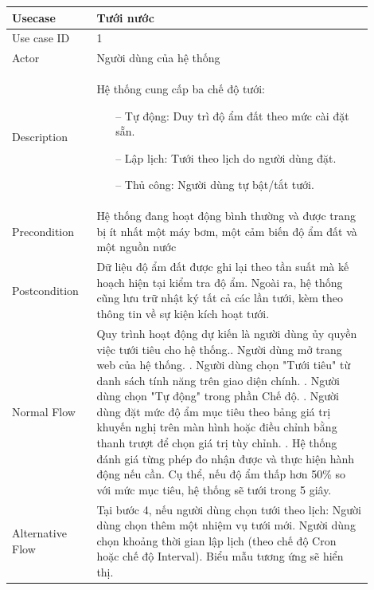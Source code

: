 \renewcommand{\arraystretch}{1.6}
\begin{table}[H]
\centering
\begin{tabular}{|p{0.2\linewidth}|p{0.7\linewidth}|}
\hline
\rowcolor[HTML]{EFEFEF} 
\textbf{Usecase}        & \textbf{Tưới nước} \\ \hline
Use case ID             & 1 \\ \hline
Actor                   & Người dùng của hệ thống \\ \hline
Description             & 
Hệ thống cung cấp ba chế độ tưới:
\begin{itemize}
    \item [--] Tự động: Duy trì độ ẩm đất theo mức cài đặt sẵn.
    \item [--] Lập lịch: Tưới theo lịch do người dùng đặt.
    \item [--] Thủ công: Người dùng tự bật/tắt tưới.
\end{itemize}
\\ \hline
Precondition            & Hệ thống đang hoạt động bình thường và được trang bị ít nhất một máy bơm, một cảm biến độ ẩm đất và một nguồn nước \\ \hline
Postcondition           & Dữ liệu độ ẩm đất được ghi lại theo tần suất mà kế hoạch hiện tại kiểm tra độ ẩm. Ngoài ra, hệ thống cũng lưu trữ nhật ký tất cả các lần tưới, kèm theo thông tin về sự kiện kích hoạt tưới. \\ \hline
Normal Flow             & 
Quy trình hoạt động dự kiến là người dùng ủy quyền việc tưới tiêu cho hệ thống.\newline
1. Người dùng mở trang web của hệ thống. \newline
3. Người dùng chọn "Tưới tiêu" từ danh sách tính năng trên giao diện chính. \newline
4. Người dùng chọn "Tự động" trong phần Chế độ. \newline
5. Người dùng đặt mức độ ẩm mục tiêu theo bảng giá trị khuyến nghị trên màn hình hoặc điều chỉnh bằng thanh trượt để chọn giá trị tùy chỉnh. \newline
6. Hệ thống đánh giá từng phép đo nhận được và thực hiện hành động nếu cần. Cụ thể, nếu độ ẩm thấp hơn 50\% so với mức mục tiêu, hệ thống sẽ tưới trong 5 giây. 
\\ \hline
Alternative Flow          & 
    Tại bước 4, nếu người dùng chọn tưới theo lịch: \newline
    4.1 Người dùng chọn thêm một nhiệm vụ tưới mới. \newline
    4.2 Người dùng chọn khoảng thời gian lập lịch (theo chế độ Cron hoặc chế độ Interval). Biểu mẫu tương ứng sẽ hiển thị. \newline

\end{tabular}
\end{table}
